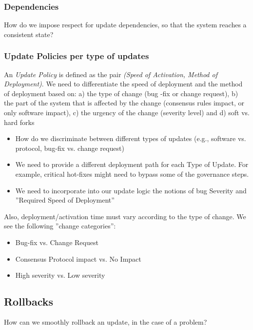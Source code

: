 \subsubsection*{Dependencies}
How do we impose respect for update dependencies, so that the system reaches a consistent state? 

\subsubsection*{Update Policies per type of updates}
An \emph{Update Policy} is defined as the pair \emph{(Speed of Activation, Method of Deployment)}. We need to differentiate the speed of deployment and the method of deployment based on: a) the type of change (bug -fix or change request), b) the part of the system that is affected by the change (consensus rules impact, or only software impact), c) the urgency of the change (severity level)
and d) soft vs. hard forks


\begin{itemize}
\item How do we discriminate between different types of updates (e.g., software vs. protocol, bug-fix vs. change request)
\item We need to provide a different deployment path for each Type of Update. For example, critical hot-fixes might need to bypass some of the governance steps.
\item We need to incorporate into our update logic the notions of bug Severity and ''Required Speed of Deployment''
\end{itemize}

Also, deployment/activation time must vary according to the type of change. We see the following ''change categories'':
\begin{itemize}
\item Bug-fix vs. Change Request
\item Consensus Protocol impact vs. No Impact
\item High severity vs. Low severity
\end{itemize}

\subsection*{Rollbacks}
How can we smoothly rollback an update, in the case of a problem?



